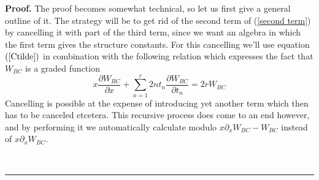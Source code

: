 \documentclass[a4paper,11pt]{article}
\newenvironment{proof}[1][Proof]{\textbf{#1.} }{\ \rule{0.5em}{0.5em}}
\numberwithin{equation}{section}
\begin{document}
\begin{proof}
\noindent The proof becomes somewhat technical, so let us first
give a general outline of it. The strategy will be to get rid of the second
term of (\ref{second term}) by cancelling it with part of the third term,
since we want an algebra in which the first term gives the structure
constants. For this cancelling we'll use equation $\left( \ref{Ctilde}%
\right) $ in combination with the following relation which expresses the
fact that $W_{BC}$ is a graded function
\begin{equation}
x\frac{\partial W_{BC}}{\partial x}+\sum_{n=1}^{r}2nt_{n}\frac{\partial
W_{BC}}{\partial t_{n}}=2rW_{BC}  \label{scaling}
\end{equation}
Cancelling is possible at the expense of introducing yet another term which
then has to be canceled etcetera. This recursive process does come to an end
however, and by performing it we automatically calculate modulo $x\partial
_{x}W_{BC}-W_{BC}$ instead of $x\partial _{x}W_{BC}$.
  

\end{proof}
\end{document}
